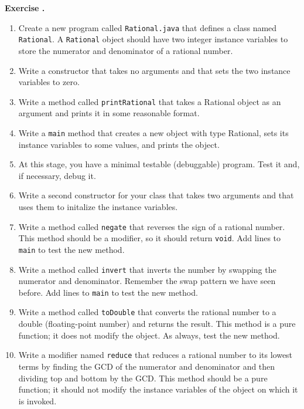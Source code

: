 \documentclass{book}
\newcounter{exercisenum}
\renewcommand{\theexercisenum}{{\thechapter}.\arabic{exercisenum}}
\newenvironment{exercisesize}{\begin{small}}{\end{small}}
\newcommand{\exerciseheader}[2]{                                          
     
  \begin{exercisesize}                                                    
     
     
  \def\theenumi{\alph{enumi}}                                             
  \def\labelenumi{\theenumi.}                                             
  \def\theenumii{\roman{enumii}}                                          
  \def\labelenumii{\theenumii.}                                           
  {\bf Exercise {#1}{#2}}\hspace{0.1in}                 
}
\newcommand{\startexercise}[1]{%
  \refstepcounter{exercisenum}                                            
  \exerciseheader{\theexercisenum}{#1}                                    
}
\newcommand{\stopexercise}{%
  {\hfill}                                                               
  \end{exercisesize}      
}
\newcommand{\normaldif}{}
\newenvironment{exercise}{\startexercise{\normaldif{}}}{\stopexercise}
\begin{document}
\begin{exercise}
\begin{enumerate}
\item Create a new program called {\tt Rational.java} that defines a
class named {\tt Rational}.  A {\tt Rational} object should have two
integer instance variables to store the numerator and denominator of a
rational number.

\item Write a constructor that takes no arguments and that sets the
two instance variables to zero.

\item Write a method called {\tt printRational} that takes
a Rational object as an argument and prints it in some
reasonable format.

\item Write a {\tt main} method that creates a new object with
type Rational, sets its instance variables to some values, and prints
the object.

\item At this stage, you have a minimal testable (debuggable)
program.  Test it and, if necessary, debug it.

\item Write a second constructor for your class that takes two
arguments and that uses them to initalize the instance
variables.

\item Write a method called {\tt negate} that reverses the sign of
a rational number.  This method should be a modifier, so it should
return {\tt void}.  Add lines to {\tt main} to test the new method.

\item Write a method called {\tt invert} that inverts the number by
swapping the numerator and denominator.  Remember the swap pattern we
have seen before.  Add lines to {\tt main} to test the new method.

\item Write a method called {\tt toDouble} that converts the rational
number to a double (floating-point number) and returns the result.
This method is a pure function; it does not modify the object.
As always, test the new method.

\item Write a modifier named {\tt reduce} that reduces a rational number
to its lowest terms by finding the GCD of the numerator and denominator
and then dividing top and bottom by the GCD.
This method should be a pure function; it should not modify
the instance variables of the object on which it is invoked.


\end{enumerate}
\end{exercise}
\end{document}
